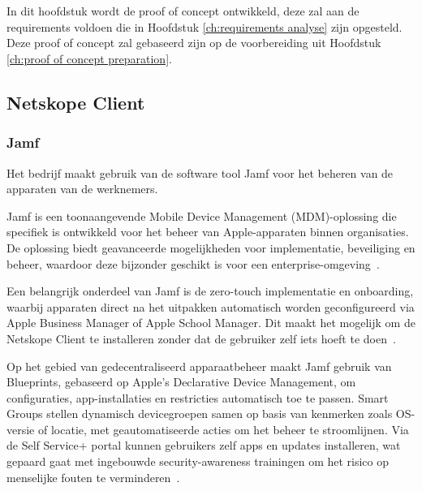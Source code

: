 
\chapter{}%
\label{ch:proof of concept implementation}

In dit hoofdstuk wordt de proof of concept ontwikkeld, deze zal aan de requirements voldoen die in Hoofdstuk \ref{ch:requirements analyse} zijn opgesteld. Deze proof of concept zal gebaseerd zijn op de voorbereiding uit Hoofdstuk \ref{ch:proof of concept preparation}.

\section{Netskope Client}

\subsection{Jamf}
Het bedrijf maakt gebruik van de software tool Jamf voor het beheren van de apparaten van de werknemers.

\vspace{2ex}

Jamf is een toonaangevende Mobile Device Management (MDM)-oplossing die specifiek is ontwikkeld voor het beheer van Apple-apparaten binnen organisaties. De oplossing biedt geavanceerde mogelijkheden voor implementatie, beveiliging en beheer, waardoor deze bijzonder geschikt is voor een enterprise-omgeving~\autocite{Jamf2025}.  

\vspace{2ex}

Een belangrijk onderdeel van Jamf is de zero-touch implementatie en onboarding, waarbij apparaten direct na het uitpakken automatisch worden geconfigureerd via Apple Business Manager of Apple School Manager.  Dit maakt het mogelijk om de Netskope Client te installeren zonder dat de gebruiker zelf iets hoeft te doen~\autocite{Jamf2025}.

\vspace{2ex}

Op het gebied van gedecentraliseerd apparaatbeheer maakt Jamf gebruik van Blueprints, gebaseerd op Apple’s Declarative Device Management, om configuraties, app-installaties en restricties automatisch toe te passen. Smart Groups stellen dynamisch devicegroepen samen op basis van kenmerken zoals OS-versie of locatie, met geautomatiseerde acties om het beheer te stroomlijnen. Via de Self Service+ portal kunnen gebruikers zelf apps en updates installeren, wat gepaard gaat met ingebouwde security-awareness trainingen om het risico op menselijke fouten te verminderen~\autocite{Jamf2025}.

